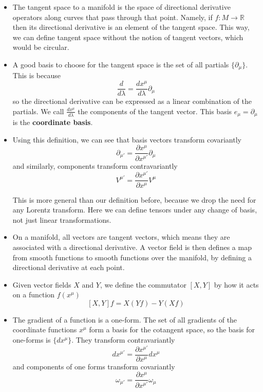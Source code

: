 \documentclass[11pt]{article}
\begin{document}
\begin{itemize}
    \item The tangent space to a manifold is the space of directional derivative operators along curves that pass through that point. Namely, if \(f \colon M \rightarrow \mathbb{R}\) then its directional derivative is an element of the tangent space. This way, we can define tangent space without the notion of
    tangent vectors, which would be circular.

    \item A good basis to choose for the tangent space is the set of all partials \(\{\partial_\mu\}\). This is because 
    \[
        \frac{d}{d \lambda} = \frac{dx^\mu}{d\lambda}\partial_\mu   
    \]
    so the directional derivative can be expressed as a linear combination of the partials. We call \(\frac{dx^\mu}{d\lambda}\) the components of the tangent vector. This basis \(\hat{e}_\mu = \partial_\mu\) is the \textbf{coordinate basis}.

    \item Using this definition, we can see that basis vectors transform covariantly
    \[
        \partial_{\mu'} = \frac{\partial x^\mu}{\partial x^{\mu'}}\partial_\mu
    \]
    and similarly, components transform contravariantly
    \[
        V^{\mu'} = \frac{\partial x^{\mu'}}{\partial x^\mu}V^\mu
    \]

    This is more general than our definition before, because we drop the need for any Lorentz transform. Here we can define tensors under any change of basis, not just linear transformations.
    
    \item On a manifold, all vectors are tangent vectors, which means they are associated with a directional derivative. A vector field is then defines a map from smooth functions to smooth functions over the manifold, by defining a directional derivative at each point.
    
    \item Given vector fields \(X\) and \(Y\), we define the commutator \([X,Y]\) by how it acts on a function \(f(x^\mu)\)
    \[
        [X,Y]f = X(Yf) - Y(Xf)
    \]

    \item The gradient of a function is a one-form. The set of all gradients of the coordinate functions \(x^\mu\) form a basis for the cotangent space, so the basis for one-forms is \(\{dx^\mu\}\). They transform contravariantly
    \[
        dx^{\mu'} = \frac{\partial x^{\mu'}}{\partial x^\mu}dx^\mu
    \]
    and components of one forms transform covariantly
    \[
        \omega_{\mu'} = \frac{\partial x^\mu}{\partial x^{\mu'}}\omega_\mu
    \]
    

    
\end{itemize}
\end{document}
